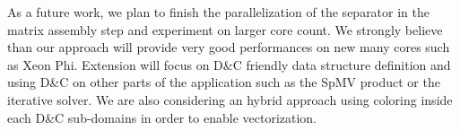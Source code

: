 \documentclass{IOS-Book-Article}
\begin{document}
As a future work, we plan to finish the parallelization of the separator in the matrix assembly step and experiment on larger core count.
We strongly believe than our approach will provide very good performances on new many cores such as Xeon Phi.
Extension will focus on D\&C friendly data structure definition and using D\&C on other parts of the application such as the SpMV product or the iterative solver. 
We are also considering an hybrid approach using coloring inside each D\&C sub-domains in order to enable vectorization.


\end{document}
